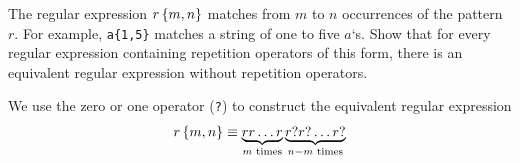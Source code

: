 \begin{exercise}\label{ex:030309}
    The regular expression $r\left\{ m,n \right\}$ matches from $m$ to $n$ occurrences 
    of the pattern $r$. For example, \texttt{a\{1,5\}} matches a string of one 
    to five $a$`s. Show that for every regular expression containing repetition 
    operators of this form, there is an equivalent regular expression without 
    repetition operators.
\end{exercise}
\begin{solution}\label{sol:030309}
    We use the zero or one operator (\texttt{?}) to construct the equivalent 
    regular expression
    \begin{align*}
        r\left\{ m,n \right\} \equiv \underbrace{rr\ldots r}_{m\textrm{ times}}\underbrace{r?r?\ldots r?}_{n-m\textrm{ times}}
    \end{align*}
\end{solution}